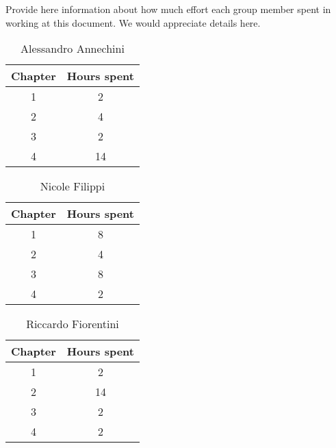 Provide here information about how much effort each group member spent in working at this document. We would appreciate details here.


\begin{table}[h!]
  \centering
  \begin{tabular}{|c|c|}
    \hline
    Chapter & Hours spent \\
    \hline
    1 & 2\\
    \hline
    2 & 4\\
    \hline
    3 & 2\\
    \hline
    4 & 14\\
    \hline
  \end{tabular}
  \caption{Alessandro Annechini}
  \label{tab:Alessandro_Annechini_hours}
\end{table}

\begin{table}[h!]
  \centering
  \begin{tabular}{|c|c|}
    \hline
    Chapter & Hours spent \\
    \hline
    1 & 8\\
    \hline
    2 & 4\\
    \hline
    3 & 8\\
    \hline
    4 & 2\\
    \hline
  \end{tabular}
  \caption{Nicole Filippi}
  \label{tab:Nicole_Filippi_hours}
\end{table}

\begin{table}[h!]
  \centering
  \begin{tabular}{|c|c|}
    \hline
    Chapter & Hours spent \\
    \hline
    1 & 2\\
    \hline
    2 & 14\\
    \hline
    3 & 2\\
    \hline
    4 & 2\\
    \hline
  \end{tabular}
  \caption{Riccardo Fiorentini}
  \label{tab:Riccardo_Fiorentini_hours}
\end{table}
